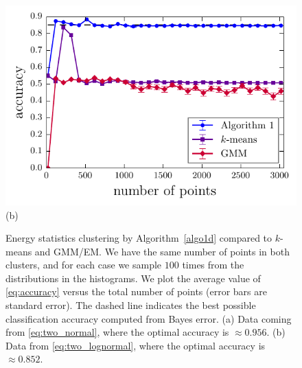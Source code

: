 \documentclass[aps,preprint,nofootinbib,floatfix]{revtex4-1}
\begin{document}
\begin{figure}
\begin{minipage}{0.49\textwidth}
\includegraphics[width=\textwidth]{loggauss1d.pdf}\\[-1em]
(b)
\end{minipage}
\caption{
\label{fig:1d}
Energy statistics clustering by Algorithm~\ref{algo1d}
compared to $k$-means and GMM/EM.
We have the same number of points in both clusters, and for each case
we sample $100$ times from the distributions in the histograms. We 
plot the average value of 
\eqref{eq:accuracy} versus the total number of points 
(error bars are standard error). The dashed line indicates the
best possible classification accuracy computed from Bayes error.
(a) Data coming from \eqref{eq:two_normal}, where the
optimal accuracy is $\approx 0.956$.
(b) Data from \eqref{eq:two_lognormal}, where the optimal
accuracy is $\approx 0.852$.
}
\end{figure}
\end{document}
